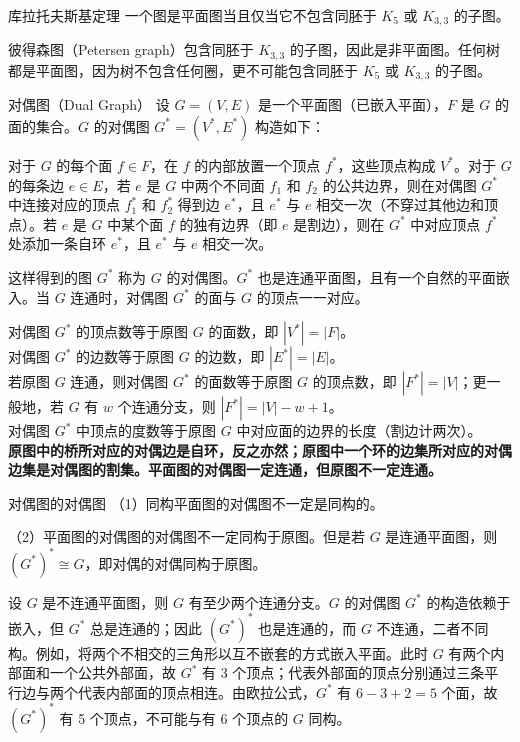 \documentclass[lang=cn,11pt]{elegantbook}
\begin{document}
\begin{theorem}{库拉托夫斯基定理}
    一个图是平面图当且仅当它不包含同胚于 $K_5$ 或 $K_{3,3}$ 的子图。
\end{theorem}
彼得森图（Petersen graph）包含同胚于 $K_{3,3}$ 的子图，因此是非平面图。任何树都是平面图，因为树不包含任何圈，更不可能包含同胚于 $K_5$ 或 $K_{3,3}$ 的子图。
\begin{definition}{对偶图（Dual Graph）}
设 $G=(V,E)$ 是一个平面图（已嵌入平面），$F$ 是 $G$ 的面的集合。$G$ 的对偶图 $G^*=(V^*,E^*)$ 构造如下：

对于 $G$ 的每个面 $f \in F$，在 $f$ 的内部放置一个顶点 $f^*$，这些顶点构成 $V^*$。对于 $G$ 的每条边 $e \in E$，若 $e$ 是 $G$ 中两个不同面 $f_1$ 和 $f_2$ 的公共边界，则在对偶图 $G^*$ 中连接对应的顶点 $f_1^*$ 和 $f_2^*$ 得到边 $e^*$，且 $e^*$ 与 $e$ 相交一次（不穿过其他边和顶点）。若 $e$ 是 $G$ 中某个面 $f$ 的独有边界（即 $e$ 是割边），则在 $G^*$ 中对应顶点 $f^*$ 处添加一条自环 $e^*$，且 $e^*$ 与 $e$ 相交一次。

这样得到的图 $G^*$ 称为 $G$ 的对偶图。$G^*$ 也是连通平面图，且有一个自然的平面嵌入。当 $G$ 连通时，对偶图 $G^*$ 的面与 $G$ 的顶点一一对应。
\end{definition}
对偶图 $G^*$ 的顶点数等于原图 $G$ 的面数，即 $|V^*| = |F|$。\\
对偶图 $G^*$ 的边数等于原图 $G$ 的边数，即 $|E^*| = |E|$。\\
若原图 $G$ 连通，则对偶图 $G^*$ 的面数等于原图 $G$ 的顶点数，即 $|F^*| = |V|$；更一般地，若 $G$ 有 $w$ 个连通分支，则 $|F^*|=|V|-w+1$。\\
对偶图 $G^*$ 中顶点的度数等于原图 $G$ 中对应面的边界的长度（割边计两次）。\\
\textbf{原图中的桥所对应的对偶边是自环，反之亦然；原图中一个环的边集所对应的对偶边集是对偶图的割集。平面图的对偶图一定连通，但原图不一定连通。}
\begin{theorem}{对偶图的对偶图}
（1）同构平面图的对偶图不一定是同构的。

（2）平面图的对偶图的对偶图不一定同构于原图。但是若 $G$ 是连通平面图，则 $(G^*)^* \cong G$，即对偶的对偶同构于原图。
\end{theorem}
设 $G$ 是不连通平面图，则 $G$ 有至少两个连通分支。$G$ 的对偶图 $G^*$ 的构造依赖于嵌入，但 $G^*$ 总是连通的；因此 $(G^*)^*$ 也是连通的，而 $G$ 不连通，二者不同构。例如，将两个不相交的三角形以互不嵌套的方式嵌入平面。此时 $G$ 有两个内部面和一个公共外部面，故 $G^*$ 有 3 个顶点；代表外部面的顶点分别通过三条平行边与两个代表内部面的顶点相连。由欧拉公式，$G^*$ 有 $6-3+2=5$ 个面，故 $(G^*)^*$ 有 5 个顶点，不可能与有 6 个顶点的 $G$ 同构。
\end{document}
